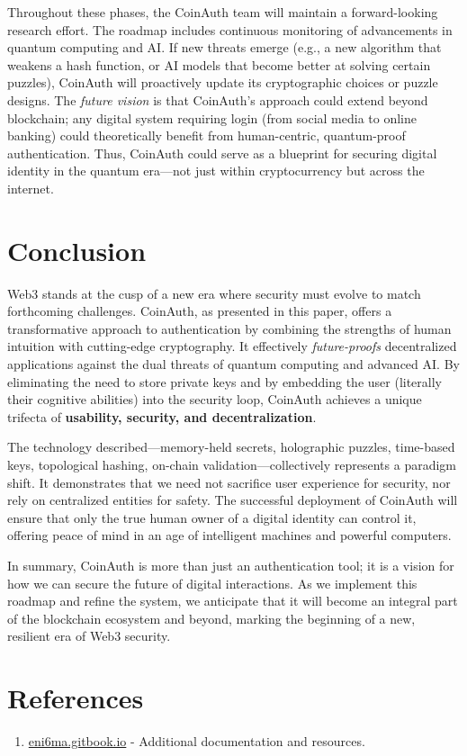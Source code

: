 \documentclass[10pt,letterpaper]{article}
\begin{document}
Throughout these phases, the CoinAuth team will maintain a forward-looking research effort. The roadmap includes continuous monitoring of advancements in quantum computing and AI. If new threats emerge (e.g., a new algorithm that weakens a hash function, or AI models that become better at solving certain puzzles), CoinAuth will proactively update its cryptographic choices or puzzle designs. The \emph{future vision} is that CoinAuth’s approach could extend beyond blockchain; any digital system requiring login (from social media to online banking) could theoretically benefit from human-centric, quantum-proof authentication. Thus, CoinAuth could serve as a blueprint for securing digital identity in the quantum era—not just within cryptocurrency but across the internet.

\section{Conclusion}
Web3 stands at the cusp of a new era where security must evolve to match forthcoming challenges. CoinAuth, as presented in this paper, offers a transformative approach to authentication by combining the strengths of human intuition with cutting-edge cryptography. It effectively \emph{future-proofs} decentralized applications against the dual threats of quantum computing and advanced AI. By eliminating the need to store private keys and by embedding the user (literally their cognitive abilities) into the security loop, CoinAuth achieves a unique trifecta of \textbf{usability, security, and decentralization}.

The technology described---memory-held secrets, holographic puzzles, time-based keys, topological hashing, on-chain validation---collectively represents a paradigm shift. It demonstrates that we need not sacrifice user experience for security, nor rely on centralized entities for safety. The successful deployment of CoinAuth will ensure that only the true human owner of a digital identity can control it, offering peace of mind in an age of intelligent machines and powerful computers.

In summary, CoinAuth is more than just an authentication tool; it is a vision for how we can secure the future of digital interactions. As we implement this roadmap and refine the system, we anticipate that it will become an integral part of the blockchain ecosystem and beyond, marking the beginning of a new, resilient era of Web3 security.

\section*{References}
\begin{enumerate}
\item \href{https://eni6ma.gitbook.io}{eni6ma.gitbook.io} - Additional documentation and resources.
\end{enumerate}
\end{document}
